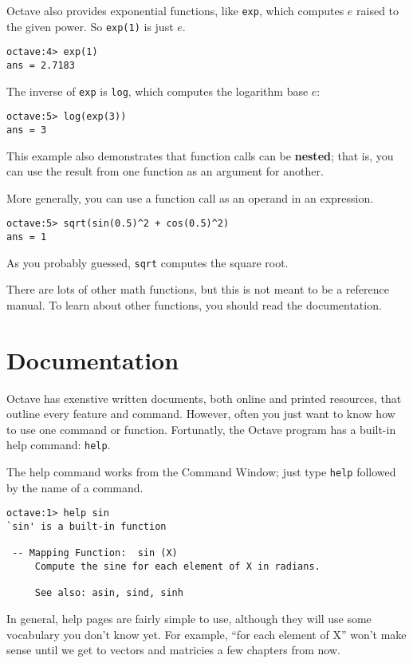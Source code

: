 Octave also provides exponential functions, like {\tt exp}, which
computes $e$ raised to the given power. So {\tt exp(1)} is just $e$.

\begin{verbatim}
octave:4> exp(1)
ans = 2.7183
\end{verbatim}

The inverse of {\tt exp} is {\tt log}, which computes the logarithm
base $e$:

\begin{verbatim}
octave:5> log(exp(3))
ans = 3
\end{verbatim}

This example also demonstrates that function calls can be {\bf nested};
that is, you can use the result from one function as an argument for
another.

More generally, you can use a function call as an operand in an expression.

\begin{verbatim}
octave:5> sqrt(sin(0.5)^2 + cos(0.5)^2)
ans = 1
\end{verbatim}

As you probably guessed, {\tt sqrt} computes the square root.

There are lots of other math functions, but this is not meant to
be a reference manual. To learn about other functions, you should
read the documentation.


\section{Documentation}

Octave has exenstive written documents, both online and printed resources,
that outline every feature and command. However, often you just want to know
how to use one command or function. Fortunatly, the Octave program has a
built-in help command:
{\tt help}.

The help command works from the Command Window; just type {\tt help}
followed by the name of a command.

\begin{verbatim}
octave:1> help sin
`sin' is a built-in function

 -- Mapping Function:  sin (X)
     Compute the sine for each element of X in radians.

     See also: asin, sind, sinh
\end{verbatim}

In general, help pages are fairly simple to use, although they will use some
vocabulary you don't know yet. For example, ``for each element of X'' won't make
sense until we get to vectors and matricies a few chapters from now.

